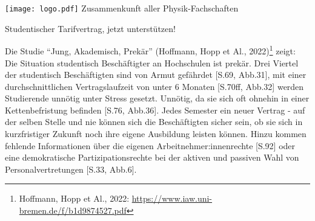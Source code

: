 \documentclass[DIV=calc]{scrartcl}
\begin{document}
\hspace{0.87\textwidth}
\begin{minipage}{120pt}
	\vspace{-1.8cm}
	\texttt{[image: logo.pdf]}
	\centering
	\small Zusammenkunft aller Physik-Fachschaften
\end{minipage}

\begin{center}
  \huge{Studentischer Tarifvertrag, jetzt unterstützen!}\vspace{.25\baselineskip}\\
  \normalsize
\end{center}
\vspace{1cm}








Die Studie “Jung, Akademisch, Prekär” (Hoffmann, Hopp et Al., 2022)\footnote{Hoffmann, Hopp et Al., 2022: \url{https://www.iaw.uni-bremen.de/f/b1d9874527.pdf}} zeigt: Die Situation studentisch Beschäftigter an Hochschulen ist prekär. Drei Viertel der studentisch Beschäftigten sind von Armut gefährdet [S.69, Abb.31], mit einer durchschnittlichen Vertragslaufzeit von unter 6 Monaten [S.70ff, Abb.32] werden Studierende unnötig unter Stress gesetzt. Unnötig, da sie sich oft ohnehin in einer Kettenbefristung befinden [S.76, Abb.36]. Jedes Semester ein neuer Vertrag - auf der selben Stelle und nie können sich die Beschäftigten sicher sein, ob sie sich in kurzfristiger Zukunft noch ihre eigene Ausbildung leisten können. Hinzu kommen fehlende Informationen über die eigenen Arbeitnehmer:innenrechte [S.92] oder eine demokratische Partizipationsrechte bei der aktiven und passiven Wahl von Personalvertretungen [S.33, Abb.6].
\end{document}
